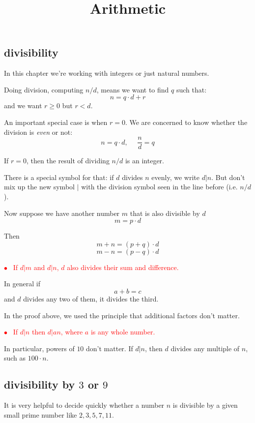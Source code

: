 \documentclass[11pt, oneside]{article}
\title{Arithmetic}
\date{}
\begin{document}
\maketitle
\Large


\subsection*{divisibility}

In this chapter we're working with integers or just natural numbers.

Doing division, computing $n/d$, means we want to find $q$ such that:
\[ n = q \cdot d + r \]
and we want $r \ge 0$ but $r < d$.

An important special case is when $r = 0$.  We are concerned to know whether the division is \emph{even} or not:
\[ n = q \cdot d, \ \ \ \ \ \ \frac{n}{d} = q \]

If $r = 0$, then the result of dividing $n/d$ is an integer.

There is a special symbol for that:  if $d$ divides $n$ evenly, we write $d|n$.  But don't mix up the new symbol $|$ with the division symbol seen in the line before (i.e. $n/d$).

Now suppose we have another number $m$ that is also divisible by $d$
\[ m = p \cdot d \]

Then 
\[ m + n = (p + q) \cdot d \]
\[ m - n = (p - q) \cdot d \]

\textcolor{red}{$\bullet$ \ If $d|m$ and $d|n$, $d$ also divides their sum and difference.} 

In general if
\[ a + b = c \]
and $d$ divides any two of them, it divides the third.

In the proof above, we used the principle that additional factors don't matter.

\textcolor{red}{$\bullet$ \ If $d|n$ then $d|an$, where $a$ is any whole number.} 

In particular, powers of $10$ don't matter.  If $d|n$, then $d$ divides any multiple of $n$, such as $100 \cdot n$.

\subsection*{divisibility by $3$ or $9$}

It is very helpful to decide quickly whether a number $n$ is divisible by a given small prime number like $2, 3, 5, 7, 11$.
\end{document}

